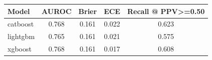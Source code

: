 \begin{tabular}{@{}lcccc@{}}
\toprule
Model & AUROC & Brier & ECE & Recall @ PPV>=0.50\\
\midrule
catboost & 0.768 & 0.161 & 0.022 & 0.623\\
lightgbm & 0.765 & 0.161 & 0.021 & 0.575\\
xgboost & 0.768 & 0.161 & 0.017 & 0.608\\
\bottomrule
\end{tabular}
